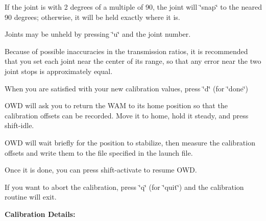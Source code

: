 \begin{DoxyItemize}
\begin{DoxyEnumerate}
\begin{DoxyItemize}
\item If the joint is with 2 degrees of a multiple of 90, the joint will \char`\"{}snap\char`\"{} to the neared 90 degrees; otherwise, it will be held exactly where it is.
\end{DoxyItemize}
\item Joints may be unheld by pressing \char`\"{}u\char`\"{} and the joint number.
\item Because of possible inaccuracies in the transmission ratios, it is recommended that you set each joint near the center of its range, so that any error near the two joint stops is approximately equal.
\end{DoxyEnumerate}
\item When you are satisfied with your new calibration values, press \char`\"{}d\char`\"{} (for \char`\"{}done\char`\"{})
\begin{DoxyEnumerate}
\item O\-W\-D will ask you to return the W\-A\-M to its home position so that the calibration offsets can be recorded. Move it to home, hold it steady, and press shift-\/idle.
\item O\-W\-D will wait briefly for the position to stabilize, then measure the calibration offsets and write them to the file specified in the launch file.
\item Once it is done, you can press shift-\/activate to resume O\-W\-D.
\end{DoxyEnumerate}
\item If you want to abort the calibration, press \char`\"{}q\char`\"{} (for \char`\"{}quit\char`\"{}) and the calibration routine will exit.
\end{DoxyItemize}

{\bfseries Calibration Details\-:}


